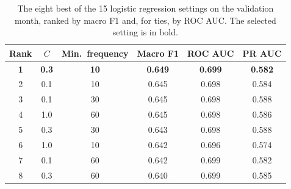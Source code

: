 \begin{table}[H]
  \centering
  \caption{The eight best of the 15 logistic regression settings on the validation month, ranked by macro F1 and, for ties, by ROC AUC. The selected setting is in bold.}
  \label{tab:val_grid_lr}
  \footnotesize
  \begin{tabular*}{0.8\textwidth}{@{\extracolsep{\fill}}cccccc@{}}
    \toprule
    Rank & $C$ & Min.\ frequency & Macro F1 & ROC AUC & PR AUC \\
    \midrule
    \textbf{1} & \textbf{0.3} & \textbf{10} & \textbf{0.649} & \textbf{0.699} & \textbf{0.582} \\
    2 & 0.1 & 10 & 0.645 & 0.698 & 0.584 \\
    3 & 0.1 & 30 & 0.645 & 0.698 & 0.588 \\
    4 & 1.0 & 60 & 0.645 & 0.698 & 0.586 \\
    5 & 0.3 & 30 & 0.643 & 0.698 & 0.588 \\
    6 & 1.0 & 10 & 0.642 & 0.696 & 0.574 \\
    7 & 0.1 & 60 & 0.642 & 0.699 & 0.582 \\
    8 & 0.3 & 60 & 0.640 & 0.699 & 0.585 \\
    \bottomrule
  \end{tabular*}
\end{table}
